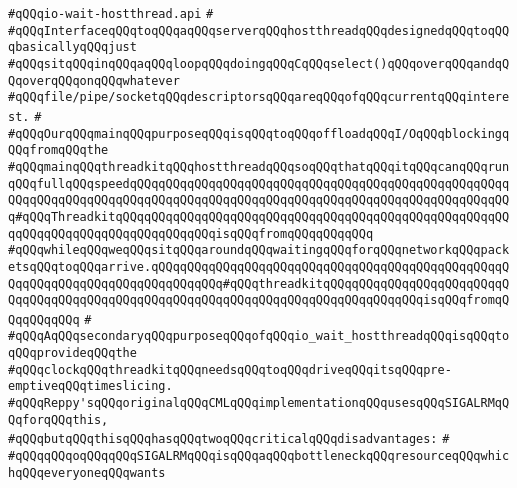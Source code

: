 \label{src/lib/std/src/hostthread/io-wait-hostthread.api}
\verb|#qQQqio-wait-hostthread.api|\newline
\verb|#|\newline
\verb|#qQQqInterfaceqQQqtoqQQqaqQQqserverqQQqhostthreadqQQqdesignedqQQqtoqQQqbasicallyqQQqjust|\newline
\verb|#qQQqsitqQQqinqQQqaqQQqloopqQQqdoingqQQqCqQQqselect()qQQqoverqQQqandqQQqoverqQQqonqQQqwhatever|\newline
\verb|#qQQqfile/pipe/socketqQQqdescriptorsqQQqareqQQqofqQQqcurrentqQQqinterest.|\newline
\verb|#|\newline
\verb|#qQQqOurqQQqmainqQQqpurposeqQQqisqQQqtoqQQqoffloadqQQqI/OqQQqblockingqQQqfromqQQqthe|\newline
\verb|#qQQqmainqQQqthreadkitqQQqhostthreadqQQqsoqQQqthatqQQqitqQQqcanqQQqrunqQQqfullqQQqspeedqQQqqQQqqQQqqQQqqQQqqQQqqQQqqQQqqQQqqQQqqQQqqQQqqQQqqQQqqQQqqQQqqQQqqQQqqQQqqQQqqQQqqQQqqQQqqQQqqQQqqQQqqQQqqQQqqQQqqQQqqQQq#qQQqThreadkitqQQqqQQqqQQqqQQqqQQqqQQqqQQqqQQqqQQqqQQqqQQqqQQqqQQqqQQqqQQqqQQqqQQqqQQqqQQqqQQqqQQqisqQQqfromqQQqqQQqqQQq|\newline
\verb|#qQQqwhileqQQqweqQQqsitqQQqaroundqQQqwaitingqQQqforqQQqnetworkqQQqpacketsqQQqtoqQQqarrive.qQQqqQQqqQQqqQQqqQQqqQQqqQQqqQQqqQQqqQQqqQQqqQQqqQQqqQQqqQQqqQQqqQQqqQQqqQQqqQQq#qQQqthreadkitqQQqqQQqqQQqqQQqqQQqqQQqqQQqqQQqqQQqqQQqqQQqqQQqqQQqqQQqqQQqqQQqqQQqqQQqqQQqqQQqqQQqisqQQqfromqQQqqQQqqQQq|\newline
\verb|#|\newline
\verb|#qQQqAqQQqsecondaryqQQqpurposeqQQqofqQQqio_wait_hostthreadqQQqisqQQqtoqQQqprovideqQQqthe|\newline
\verb|#qQQqclockqQQqthreadkitqQQqneedsqQQqtoqQQqdriveqQQqitsqQQqpre-emptiveqQQqtimeslicing.|\newline
\verb|#qQQqReppy'sqQQqoriginalqQQqCMLqQQqimplementationqQQqusesqQQqSIGALRMqQQqforqQQqthis,|\newline
\verb|#qQQqbutqQQqthisqQQqhasqQQqtwoqQQqcriticalqQQqdisadvantages:|\newline
\verb|#|\newline
\verb|#qQQqqQQqoqQQqqQQqSIGALRMqQQqisqQQqaqQQqbottleneckqQQqresourceqQQqwhichqQQqeveryoneqQQqwants|\newline
